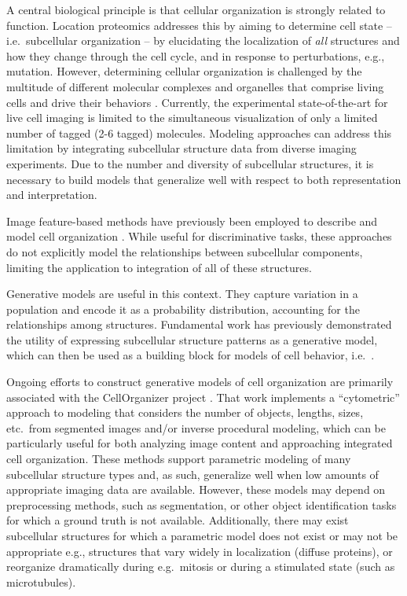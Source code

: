 \documentclass[accepted]{article}
\begin{document}
A central biological principle is that cellular organization is strongly related to function.
Location proteomics \cite{Murphy:2005dd} addresses this by aiming to determine cell state -- i.e.\ subcellular organization -- by elucidating the localization of \emph{all} structures and how they change through the cell cycle, and in response to perturbations, e.g., mutation.
However, determining cellular organization is challenged by the multitude  of different molecular complexes and organelles that comprise living cells and drive their behaviors \cite{kim2014draft}.
Currently, the experimental state-of-the-art for live cell imaging is limited to the simultaneous visualization of only a limited number of tagged (2-6 tagged) molecules.
Modeling approaches can address this limitation by integrating subcellular structure data from diverse imaging experiments.
Due to the number and diversity of subcellular structures, it is necessary to build models that generalize well with respect to both representation and interpretation.

Image feature-based methods have previously been employed to describe and model cell organization \cite{boland2001neural, Carpenter:2006iu, Rajaram:2012di}.
While  useful for discriminative tasks, these approaches do not explicitly model the relationships between subcellular components, limiting the application to integration of all of these structures.

Generative models are useful in this context.
They capture variation in a population and encode it as a probability distribution, accounting for the relationships among structures.
Fundamental work has previously demonstrated the utility of expressing subcellular structure patterns as a generative model, which can then be used as a building block for models of cell behavior, i.e.\  \cite{Murphy:2005dd,donovan2016unbiased}.

Ongoing efforts to construct generative models of cell organization are primarily associated with the CellOrganizer project \cite{Zhao:2007is, Peng:2011et}.
That work implements a ``cytometric'' approach to modeling that considers the number of objects, lengths, sizes, etc.\ from segmented images and/or inverse procedural modeling, which can be particularly useful for both analyzing image content and approaching integrated cell organization.
These methods support parametric modeling of many subcellular structure types and, as such, generalize well when low amounts of appropriate imaging data are available.
However, these models may depend on preprocessing methods, such as segmentation, or other object identification tasks for which a ground truth is not available.
Additionally, there may exist subcellular structures for which a parametric model does not exist or may not be appropriate e.g.,  structures that vary widely in localization (diffuse proteins), or reorganize dramatically during e.g.\ mitosis or during a stimulated state (such as microtubules).
\end{document}
